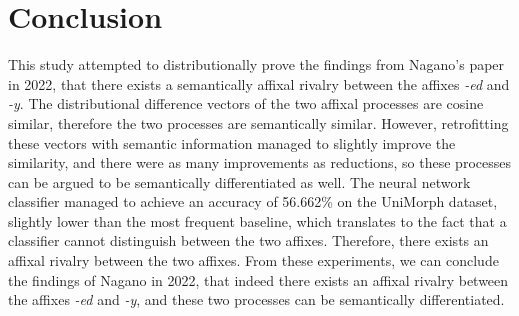 \documentclass[12pt]{article}
\begin{document}
\section{Conclusion}    
    This study attempted to distributionally prove the findings from Nagano's paper in 2022, that there exists a semantically affixal rivalry between the affixes \emph{-ed} and \emph{-y}. The distributional difference vectors of the two affixal processes are cosine similar, therefore the two processes are semantically similar. However, retrofitting these vectors with semantic information managed to slightly improve the similarity, and there were as many improvements as reductions, so these processes can be argued to be semantically differentiated as well. The neural network classifier managed to achieve an accuracy of 56.662\% on the UniMorph dataset, slightly lower than the most frequent baseline, which translates to the fact that a classifier cannot distinguish between the two affixes. Therefore, there exists an affixal rivalry between the two affixes. From these experiments, we can conclude the findings of Nagano in 2022, that indeed there exists an affixal rivalry between the affixes \emph{-ed} and \emph{-y}, and these two processes can be semantically differentiated. 
\nocite{*}

\end{document}
